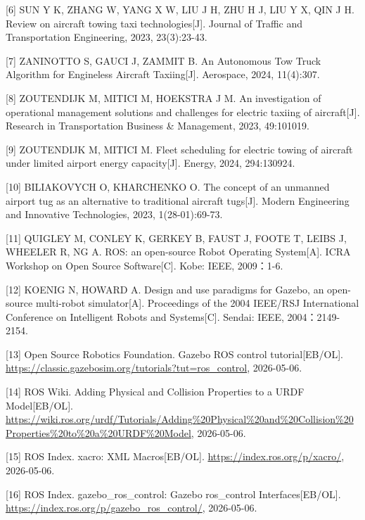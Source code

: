 \documentclass[UTF8,a4paper,12pt]{ctexart}
\begin{document}
{[}6{]} SUN Y K, ZHANG W, YANG X W, LIU J H, ZHU H J, LIU Y X, QIN J H. Review on aircraft towing taxi technologies{[}J{]}. Journal of Traffic and Transportation Engineering, 2023, 23(3):23-43.

{[}7{]} ZANINOTTO S, GAUCI J, ZAMMIT B. An Autonomous Tow Truck Algorithm for Engineless Aircraft Taxiing{[}J{]}. Aerospace, 2024, 11(4):307.

{[}8{]} ZOUTENDIJK M, MITICI M, HOEKSTRA J M. An investigation of operational management solutions and challenges for electric taxiing of aircraft{[}J{]}. Research in Transportation Business \& Management, 2023, 49:101019.

{[}9{]} ZOUTENDIJK M, MITICI M. Fleet scheduling for electric towing of aircraft under limited airport energy capacity{[}J{]}. Energy, 2024, 294:130924.

{[}10{]} BILIAKOVYCH O, KHARCHENKO O. The concept of an unmanned airport tug as an alternative to traditional aircraft tugs{[}J{]}. Modern Engineering and Innovative Technologies, 2023, 1(28-01):69-73.

{[}11{]} QUIGLEY M, CONLEY K, GERKEY B, FAUST J, FOOTE T, LEIBS J, WHEELER R, NG A. ROS: an open-source Robot Operating System{[}A{]}. ICRA Workshop on Open Source Software{[}C{]}. Kobe: IEEE, 2009：1-6.

{[}12{]} KOENIG N, HOWARD A. Design and use paradigms for Gazebo, an open-source multi-robot simulator{[}A{]}. Proceedings of the 2004 IEEE/RSJ International Conference on Intelligent Robots and Systems{[}C{]}. Sendai: IEEE, 2004：2149-2154.

{[}13{]} Open Source Robotics Foundation. Gazebo ROS control tutorial{[}EB/OL{]}. \href{https://classic.gazebosim.org/tutorials?tut=ros_control&utm_source=chatgpt.com}{https://classic.gazebosim.org/tutorials?tut=ros\_control}, 2026-05-06.

{[}14{]} ROS Wiki. Adding Physical and Collision Properties to a URDF Model{[}EB/OL{]}. \href{https://wiki.ros.org/urdf/Tutorials/Adding\%20Physical\%20and\%20Collision\%20Properties\%20to\%20a\%20URDF\%20Model?utm_source=chatgpt.com}{https://wiki.ros.org/urdf/Tutorials/Adding\%20Physical\%20and\%20Collision\%20Properties\%20to\%20a\%20URDF\%20Model}, 2026-05-06.

{[}15{]} ROS Index. xacro: XML Macros{[}EB/OL{]}. \href{https://index.ros.org/p/xacro/?utm_source=chatgpt.com}{https://index.ros.org/p/xacro/}, 2026-05-06.

{[}16{]} ROS Index. gazebo\_ros\_control: Gazebo ros\_control Interfaces{[}EB/OL{]}. \href{https://index.ros.org/p/gazebo_ros_control/?utm_source=chatgpt.com}{https://index.ros.org/p/gazebo\_ros\_control/}, 2026-05-06.
\end{document}
